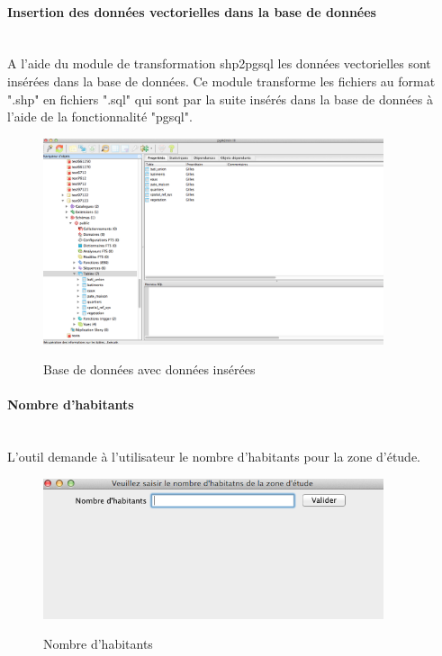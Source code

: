 \paragraph{Insertion des données vectorielles dans la base de données\\\\}

A l'aide du module de transformation shp2pgsql les données vectorielles sont insérées dans la base de données. Ce module transforme les fichiers au format ".shp" en fichiers ".sql" qui sont par la suite insérés dans la base de données à l'aide de la fonctionnalité "pgsql".\\

\begin{figure}[H]
\begin{center}
\includegraphics[width=10cm]{Chaine4}\\
\caption{\label{Chaine4} Base de données avec données insérées}
\end{center}
\end{figure}


\paragraph{Nombre d'habitants\\\\}

L'outil demande à l'utilisateur le nombre d'habitants pour la zone d'étude.\\

\begin{figure}[H]
\begin{center}
\includegraphics[width=10cm]{Chaine5}\\
\caption{\label{Chaine5} Nombre d'habitants}
\end{center}
\end{figure}


